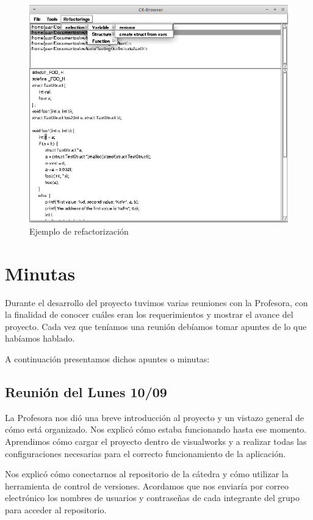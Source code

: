 \documentclass[a4paper,oneside,12pt]{article}
\begin{document}
\begin{figure}[h!]
  \centering
    \includegraphics[scale=0.50]{images/uso/rename.jpg}
     \caption{Ejemplo de refactorizaci\'on}
     \label{rename}
\end{figure}

\clearpage

\section{Minutas}
\label{sec:minutas}
Durante el desarrollo del proyecto tuvimos varias reuniones con la Profesora, con la finalidad de conocer cu\'ales eran los requerimientos y mostrar el avance del proyecto. Cada vez que ten\'iamos una reuni\'on deb\'iamos tomar apuntes de lo que hab\'iamos hablado.

A continuaci\'on presentamos dichos apuntes o minutas:

\subsection{Reuni\'on del Lunes 10/09}
La Profesora nos di\'o una breve introducci\'on al proyecto y un vistazo general de c\'omo est\'a organizado. Nos explic\'o c\'omo estaba funcionando hasta ese momento. Aprendimos c\'omo cargar el proyecto dentro de visualworks y a realizar todas las configuraciones necesarias para el correcto funcionamiento de la aplicaci\'on.

Nos explic\'o c\'omo conectarnos al repositorio de la c\'atedra y c\'omo utilizar la herramienta de control de versiones.
Acordamos que nos enviar\'ia por correo electr\'onico los nombres de usuarios y contraseñas de cada integrante del grupo para acceder al repositorio.
\end{document}
